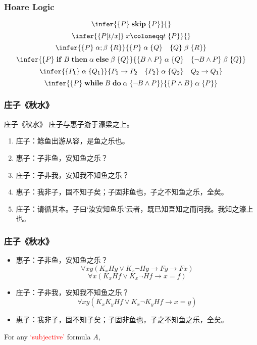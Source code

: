 \documentclass[UTF8,11pt,colorlinks,compress,openany]{beamer}%
\begin{document}
\begin{frame}\frametitle{Hoare Logic}
\[\infer{\{P\} \;\mathbf{skip}\; \{P\}}{}\]
\[\infer{\{P[t/x]\}\; x\coloneqq t\; \{P\}}{}\]
\[\infer{\{P\}\; \alpha;\beta\; \{R\}}{\{P\}\;\alpha\;\{Q\}\quad\{Q\}\;\beta\;\{R\}}\]
\[\infer{\{P\} \;\mathbf{if}\; B \;\mathbf{then}\; \alpha \;\mathbf{else}\; \beta\; \{Q\}}{\{B\wedge P\}\;\alpha\;\{Q\}\quad\{\neg B\wedge P\}\;\beta\;\{Q\}}\]
\[\infer{\{P_1\}\;\alpha\;\{Q_1\}}{P_1\to P_2\quad \{P_2\}\;\alpha\;\{Q_2\}\quad Q_2\to Q_1}\]
\[\infer{\{P\} \;\mathbf{while}\; B \;\mathbf{do}\; \alpha\; \{\neg B\wedge P\}}{\{P\wedge B\}\; \alpha\; \{P\}}\]
\end{frame}

\begin{frame}\frametitle{庄子《秋水》}
\begin{block}{庄子《秋水》}
庄子与惠子游于濠梁之上。
\begin{enumerate}
		\item 庄子：鲦鱼出游从容，是鱼之乐也。
		\item 惠子：子非鱼，安知鱼之乐？
		\item 庄子：子非我，安知我不知鱼之乐？
		\item 惠子：我非子，固不知子矣；子固非鱼也，子之不知鱼之乐，全矣。
		\item 庄子：请循其本。子曰‘汝安知鱼乐’云者，既已知吾知之而问我。我知之濠上也。
\end{enumerate}
\end{block}
\end{frame}

\begin{frame}\frametitle{庄子《秋水》}
\begin{itemize}
\item 惠子：子非鱼，安知鱼之乐？
\[\forall xy(K_xHy\vee K_x\neg Hy\to Fy\to Fx)\]
\[\forall x(K_xHf\vee K_x\neg Hf\to x=f)\]
\item 庄子：子非我，安知我不知鱼之乐？
\[\forall xy(K_x K_yHf\vee K_x\neg K_y Hf\to x=y)\]
\item 惠子：我非子，固不知子矣；子固非鱼也，子之不知鱼之乐，全矣。
\end{itemize}
\begin{block}{}
For any \textcolor{red}{`subjective'} formula $A$,\\
\centerline{}
\end{block}
\end{frame}
\end{document}
